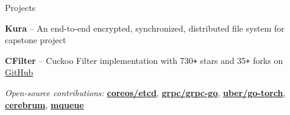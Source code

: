 \documentclass{resume} %
\begin{document}
\begin{rSection}{Projects}
  \begin{rProjectSection}{}{}
    \item \textbf {Kura} -- An end-to-end encrypted, synchronized, distributed file
      system for capstone project
    \item \textbf {CFilter} -- Cuckoo Filter implementation with 730\texttt{+}
      stars and 35\texttt{+} forks on
      \href{https://github.com/irfansharif/cfilter}{\underline {GitHub}}
  \end{rProjectSection}

  \begin{rBlurbSection}
    \item {\em Open-source contributions:}
      \href{https://github.com/coreos/etcd/pull/8288}{\textbf{coreos/etcd}},
      \href{https://github.com/grpc/grpc-go/pull/1478}{\textbf{grpc/grpc-go}},
      \href{https://github.com/uber/go-torch/pull/62}{\textbf{uber/go-torch}},
      \href{https://rubygems.org/gems/cerebrum}{\textbf{cerebrum}},
      \href{https://rubygems.org/gems/mqueue}{\textbf{mqueue}}
  \end{rBlurbSection}
\end{rSection}
\end{document}
